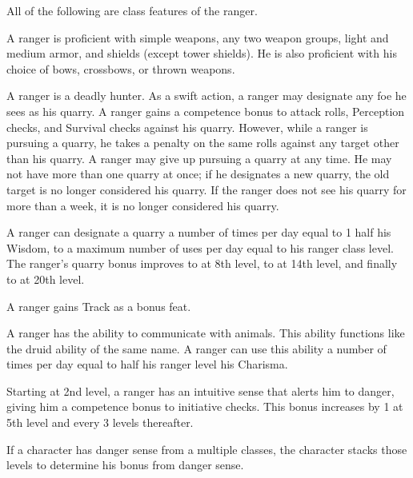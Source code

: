 
All of the following are class features of the ranger.

  A ranger is proficient with simple weapons, any two weapon groups, light and medium armor, and shields (except tower shields). He is also proficient with his choice of bows, crossbows, or thrown weapons.

 A ranger is a deadly hunter. As a swift action, a ranger may designate any foe he sees as his quarry. A ranger gains a  competence bonus to attack rolls, Perception checks, and Survival checks against his quarry. However, while a ranger is pursuing a quarry, he takes a  penalty on the same rolls against any target other than his quarry. A ranger may give up pursuing a quarry at any time. He may not have more than one quarry at once; if he designates a new quarry, the old target is no longer considered his quarry. If the ranger does not see his quarry for more than a week, it is no longer considered his quarry.

\par A ranger can designate a quarry a number of times per day equal to 1 \add half his Wisdom, to a maximum number of uses per day equal to his ranger class level. The ranger's quarry bonus improves to  at 8th level, to  at 14th level, and finally to  at 20th level.

 A ranger gains Track as a bonus feat.

 A ranger has the ability to communicate with animals. This ability functions like the druid ability of the same name. A ranger can use this ability a number of times per day equal to half his ranger level \add his Charisma.

 Starting at 2nd level, a ranger has an intuitive sense that alerts him to danger, giving him a  competence bonus to initiative checks. This bonus increases by 1 at 5th level and every 3 levels thereafter.
\par If a character has danger sense from a multiple classes, the character stacks those levels to determine his bonus from danger sense.

